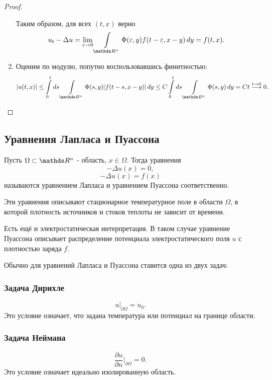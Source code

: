 \begin{proof}
\begin{enumerate}
Таким образом, для всех $(t,x)$ верно
$$ u_t - \Delta u = \lim_{\eps \to 0} \int \limits_{\real^n} \Phi(\eps, y) f(t-\eps, x-y) \, dy = f(t,x).$$

\item Оценим по модулю, попутно воспользовавшись финитностью:
$$\abs{u(t,x)} \leq \int \limits_0^t ds \int \limits_{\real^n} \Phi(s,y) |f(t-s, x-y)| \,dy \leq C \int \limits_0^t ds \int \limits_{\real^n} \Phi(s,y) \, dy = Ct \stackrel{t \to 0} \longrightarrow 0. $$
\end{enumerate}

\end{proof}

\subsection{Уравнения Лапласа и Пуассона}
\begin{definition}
Пусть $\Omega \subset \real^n$ - область, $x \in \Omega$. Тогда уравнения
\begin{equation}
    - \Delta u(x) = 0,
\label{Laplace}
\end{equation}
\begin{equation}
    -\Delta u(x) = f(x)
\label{Poisson}
\end{equation}
называются уравнением Лапласа и уравнением Пуассона соответственно. 
\end{definition}

Эти уравнения описывают стационарное температурное поле в области $\Omega$, в которой плотность источников и стоков теплоты не зависит от времени.

Есть ещё и электростатическая интерпретация. В таком случае уравнение Пуассона описывает распределение потенциала электростатического поля $u$ с плотностью заряда $f$.

Обычно для уравнений Лапласа и Пуассона ставится одна из двух задач:

\subsubsection{Задача Дирихле}
$$u \Bigg \rvert_{\partial\Omega} = u_0.$$
Это условие означает, что задана температура или потенциал на границе области. 

\subsubsection{Задача Неймана}
$$\dfrac{\partial u}{\partial n}\Bigg\rvert_{\partial\Omega} = 0.$$
Это условие означает идеально изолированную область.
